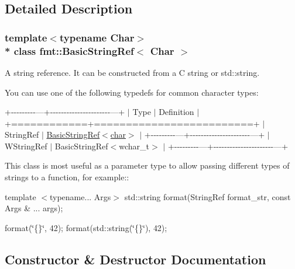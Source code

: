 \subsection{Detailed Description}
\subsubsection*{template$<$typename Char$>$\\*
class fmt\+::\+Basic\+String\+Ref$<$ Char $>$}

A string reference. It can be constructed from a C string or {\ttfamily std\+::string}.

You can use one of the following typedefs for common character types\+:

+-\/-\/-\/-\/-\/-\/-\/-\/-\/---+-\/-\/-\/-\/-\/-\/-\/-\/-\/-\/-\/-\/-\/-\/-\/-\/-\/-\/-\/-\/-\/-\/---+ $\vert$ Type $\vert$ Definition $\vert$ +============+=========================+ $\vert$ String\+Ref $\vert$ \hyperlink{classfmt_1_1BasicStringRef}{Basic\+String\+Ref$<$char$>$} $\vert$ +-\/-\/-\/-\/-\/-\/-\/-\/-\/---+-\/-\/-\/-\/-\/-\/-\/-\/-\/-\/-\/-\/-\/-\/-\/-\/-\/-\/-\/-\/-\/-\/---+ $\vert$ W\+String\+Ref $\vert$ Basic\+String\+Ref$<$wchar\+\_\+t$>$ $\vert$ +-\/-\/-\/-\/-\/-\/-\/-\/-\/---+-\/-\/-\/-\/-\/-\/-\/-\/-\/-\/-\/-\/-\/-\/-\/-\/-\/-\/-\/-\/-\/-\/---+

This class is most useful as a parameter type to allow passing different types of strings to a function, for example\+:\+:

template $<$typename... Args$>$ std\+::string format(String\+Ref format\+\_\+str, const Args \& ... args);

format(\char`\"{}\{\}\char`\"{}, 42); format(std\+::string(\char`\"{}\{\}\char`\"{}), 42);  

\subsection{Constructor \& Destructor Documentation}
